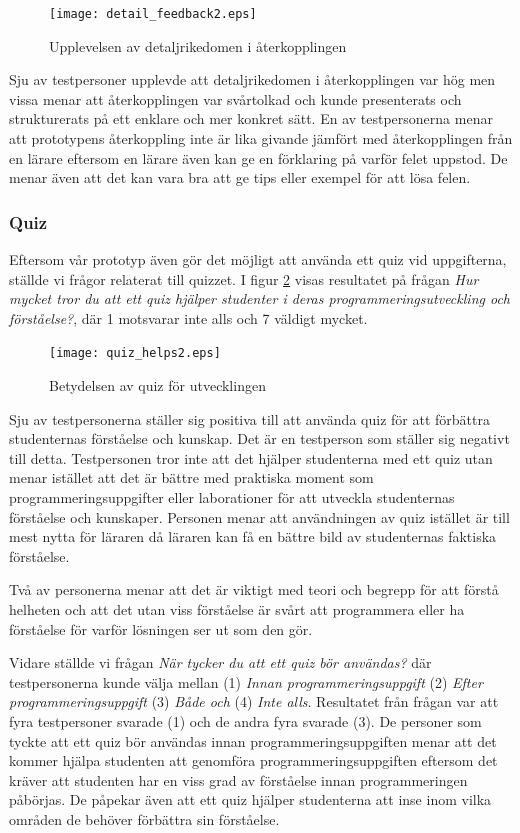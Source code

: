 \documentclass[a4paper,11pt]{article}
\begin{document}
{\begin{figure}[ht!]
\centering
\texttt{[image: detail\_feedback2.eps]}
\caption{Upplevelsen av detaljrikedomen i återkopplingen}
\label{fig:DetailFeedback}
\end{figure}

Sju av testpersoner upplevde att detaljrikedomen i återkopplingen var hög men vissa menar att återkopplingen var svårtolkad och kunde presenterats och strukturerats på ett enklare och mer konkret sätt. En av testpersonerna menar att prototypens återkoppling inte är lika givande jämfört med återkopplingen från en lärare eftersom en lärare även kan ge en förklaring på varför felet uppstod. De menar även att det kan vara bra att ge tips eller exempel för att lösa felen.

\subsubsection{Quiz}

Eftersom vår prototyp även gör det möjligt att använda ett quiz vid uppgifterna, ställde vi frågor relaterat till quizzet. I figur \ref{fig:QuizHelps} visas resultatet på frågan \textit{Hur mycket tror du att ett quiz hjälper studenter i deras programmeringsutveckling och förståelse?}, där 1 motsvarar inte alls och 7 väldigt mycket.

\begin{figure}[ht!]
\centering
\texttt{[image: quiz\_helps2.eps]}
\caption{Betydelsen av quiz för utvecklingen}
\label{fig:QuizHelps}
\end{figure}

Sju av testpersonerna ställer sig positiva till att använda quiz för att förbättra studenternas förståelse och kunskap. Det är en testperson som ställer sig negativt till detta. Testpersonen tror inte att det hjälper studenterna med ett quiz utan menar istället att det är bättre med praktiska moment som programmeringsuppgifter eller laborationer för att utveckla studenternas förståelse och kunskaper. Personen menar att användningen av quiz istället är till mest nytta för läraren då läraren kan få en bättre bild av studenternas faktiska förståelse.

Två av personerna menar att det är viktigt med teori och begrepp för att förstå helheten och att det utan viss förståelse är svårt att programmera eller ha förståelse för varför lösningen ser ut som den gör.

Vidare ställde vi frågan \textit{När tycker du att ett quiz bör användas?} där testpersonerna kunde välja mellan (1) \textit{Innan programmeringsuppgift} (2) \textit{Efter programmeringsuppgift} (3) \textit{Både och} (4) \textit{Inte alls}. Resultatet från frågan var att fyra testpersoner svarade (1) och de andra fyra svarade (3). De personer som tyckte att ett quiz bör användas innan  programmeringsuppgiften menar att det kommer hjälpa studenten att genomföra programmeringsuppgiften eftersom det kräver att studenten har en viss grad av förståelse innan programmeringen påbörjas. De påpekar även att ett quiz hjälper studenterna att inse inom vilka områden de behöver förbättra sin förståelse. 

}
\end{document}
